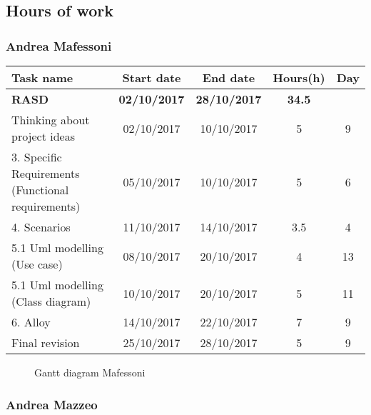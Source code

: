 \subsection{Hours of work}
\subsubsection{Andrea Mafessoni}

\begin{table}[h!]
	\begin{tabular}{lcccc}
		\toprule
		\textbf{Task name} & \textbf{Start date} & \textbf{End date} & \textbf{Hours(h)} & \textbf{Day} \\
		\midrule
		\textbf{RASD} & \textbf{02/10/2017} & \textbf{28/10/2017} & \textbf{34.5} &  \\
		Thinking about project ideas & 02/10/2017 & 10/10/2017 & 5 & 9 \\
		3. Specific Requirements (Functional requirements) & 05/10/2017 & 10/10/2017 & 5 & 6 \\
		4. Scenarios & 11/10/2017 & 14/10/2017 & 3.5 & 4 \\
		5.1 Uml modelling (Use case) & 08/10/2017 & 20/10/2017 & 4 & 13 \\
		5.1 Uml modelling (Class diagram) & 10/10/2017 & 20/10/2017 & 5 & 11 \\
		6. Alloy & 14/10/2017 & 22/10/2017 & 7 & 9 \\
		\bottomrule
		Final revision & 25/10/2017 & 28/10/2017 & 5 & 9 \\
	\end{tabular}
\end{table}

\begin{figure}[!h]
	\centering
	\caption{Gantt diagram Mafessoni}
\end{figure}
\clearpage

\subsubsection{Andrea Mazzeo}

